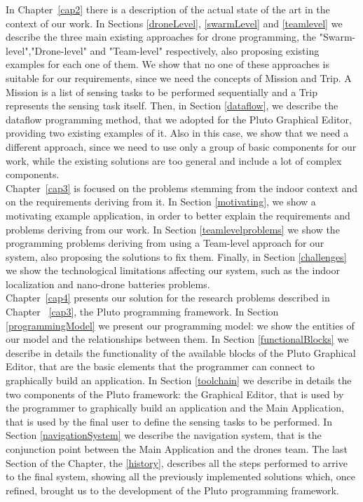In Chapter~\ref{cap2} there is a description of the actual state of the art in the context of our work.
In Sections \ref{droneLevel}, \ref{swarmLevel} and \ref{teamlevel} we describe the three main existing approaches for drone programming, the "Swarm-level","Drone-level" and "Team-level" respectively, also proposing existing examples for each one of them.
We show that no one of these approaches is suitable for our requirements, since we need the concepts of Mission and Trip.
A Mission is a list of sensing tasks to be performed sequentially and a Trip represents the sensing task itself.
Then, in Section \ref{dataflow}, we describe the dataflow programming method, that we adopted for the Pluto Graphical Editor, providing two existing examples of it.
Also in this case, we show that we need a different approach, since we need to use only a group of basic components for our work, while the existing solutions are too general and include a lot of complex components.
\\

Chapter~\ref{cap3} is focused on the problems stemming from the indoor context and on the requirements deriving from it.
In Section \ref{motivating}, we show a motivating example application, in order to better explain the requirements and problems deriving from our work.
In Section \ref{teamlevelproblems} we show the programming problems deriving from using a Team-level approach for our system, also proposing the solutions to fix them.
Finally, in Section \ref{challenges} we show the technological limitations affecting our system, such as the indoor localization and nano-drone batteries problems.
\\

Chapter~\ref{cap4} presents our solution for the research problems described in Chapter ~\ref{cap3}, the Pluto programming framework.
In Section \ref{programmingModel} we present our programming model:
we show the entities of our model and the relationships between them.
In Section \ref{functionalBlocks} we describe in details the functionality of the available blocks of the Pluto Graphical Editor, that are the basic elements that the programmer can connect to graphically build an application.
In Section \ref{toolchain} we describe in details the two components of the Pluto framework:
the Graphical Editor, that is used by the programmer to graphically build an application and the Main Application, that is used by the final user to define the sensing tasks to be performed.
In Section \ref{navigationSystem} we describe the navigation system, that is the conjunction point between the Main Application and the drones team.
The last Section of the Chapter, the \ref{history}, describes all the steps performed to arrive to the final system, showing all the previously implemented solutions which, once refined, brought us to the development of the Pluto programming framework.
\\

